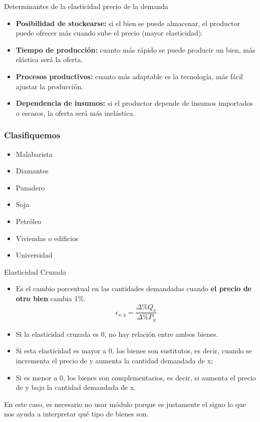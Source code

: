 \documentclass{beamer}
\begin{document}
\begin{frame}{Determinantes de la elasticidad precio de la demanda}
  \begin{itemize}
      \item \textbf{Posibilidad de stockearse:} si el bien se puede almacenar, el productor puede ofrecer más cuando sube el precio (mayor elasticidad).    
      \item \textbf{Tiempo de producción:} cuanto más rápido se puede producir un bien, más elástica será la oferta.
      \item \textbf{Procesos productivos:} cuanto más adaptable es la tecnología, más fácil ajustar la producción.
      \item \textbf{Dependencia de insumos:} si el productor depende de insumos importados o escasos, la oferta será más inelástica.
    \end{itemize}


\end{frame}
\begin{frame}
\frametitle{Clasifiquemos}
\begin{itemize}
    \item Malabarista
    \item Diamantes
    \item Panadero
    \item Soja
    \item Petróleo
    \item Viviendas o edificios
    \item Universidad
\end{itemize}
\end{frame}


      
\begin{frame}{Elasticidad Cruzada}
  \begin{itemize}
    \item Es el cambio porcentual en las cantidades demandadas cuando \textbf{el precio de otro bien} cambia 1\%.
    \begin{equation*}
      \epsilon_{x,y} = \frac{\Delta \% Q_x}{\Delta \% P_y}
    \end{equation*}
        \item Si la elasticidad cruzada es 0, no hay relación entre ambos bienes.
        \item Si esta elasticidad es mayor a 0, los bienes son sustitutos, es decir, cuando se incrementa el precio de y aumenta la cantidad demandada de x; 
        \item Si es menor a 0, los bienes son complementarios, es decir, si aumenta el precio de y baja la cantidad demandada de x.
  \end{itemize}
  \item En este caso, es necesario no usar módulo porque es justamente el signo lo que nos ayuda a interpretar qué tipo de bienes son. 
\end{frame}
\end{document}

